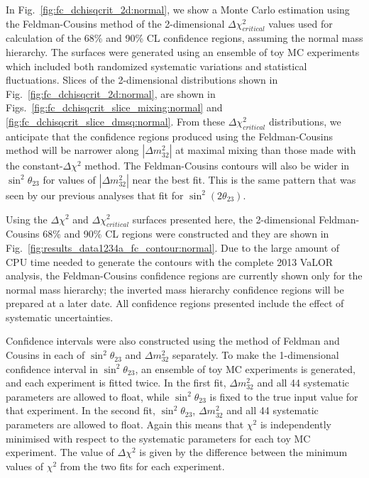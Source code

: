 In Fig.\ \ref{fig:fc_dchisqcrit_2d:normal}, we show a Monte Carlo estimation using the Feldman-Cousins method
of the 2-dimensional $\Delta\chi^{2}_{critical}$ values
used for calculation of the 68\% and 90\% CL confidence regions,
assuming the normal mass hierarchy.
The surfaces were generated using an ensemble of toy MC experiments which included both
randomized systematic variations and statistical fluctuations.
Slices of the 2-dimensional distributions shown in Fig.\ \ref{fig:fc_dchisqcrit_2d:normal},
are shown in Figs.\ \ref{fig:fc_dchisqcrit_slice_mixing:normal} and \ref{fig:fc_dchisqcrit_slice_dmsq:normal}.
From these $\Delta\chi^{2}_{critical}$ distributions, we anticipate that the confidence regions produced
using the Feldman-Cousins method will be narrower along $|\Delta{m^{2}_{32}}|$ at maximal mixing than
those made with the constant-$\Delta\chi^{2}$ method. The Feldman-Cousins contours will also be wider
in $\sin^{2}{\theta_{23}}$ for values of $|\Delta{m^{2}_{32}}|$ near the best fit.
This is the same pattern that was seen by our previous analyses 
\cite{OurRun12DisappAnalysis,OurRun123DisappAnalysis3Flavour} that fit for
$\sin^2(2\theta_{23})$.

Using the $\Delta\chi^2$ and $\Delta\chi^{2}_{critical}$ surfaces presented here,
the 2-dimensional Feldman-Cousins 68\% and 90\% CL regions were constructed 
and they are shown in Fig.\ \ref{fig:results_data1234a_fc_contour:normal}.
Due to the large amount of CPU time needed to generate the contours with the complete 2013 VaLOR analysis,
the Feldman-Cousins confidence regions are currently shown
only for the normal mass hierarchy;
the inverted mass hierarchy confidence regions will be prepared at a later date.
All confidence regions presented include the effect of systematic uncertainties.

Confidence intervals were also constructed using the method of Feldman and Cousins in each of $\sin^2 \theta_{23}$ and $
\Delta m_{32}^{2}$ separately. To make the 1-dimensional confidence interval in $\sin^2 \theta_{23}$, an ensemble of 
toy MC experiments is generated, and each experiment is fitted twice. In the first fit, $\Delta m_{32}^{2}$ and 
all 44 systematic parameters are allowed to float, while $\sin^2 \theta_{23}$ is fixed to the true input value 
for that experiment. In the second fit, $\sin^2 \theta_{23}$, $\Delta m_{32}^{2}$ and all 44 systematic parameters 
are allowed to float. Again this means that $\chi^{2}$ is independently minimised with respect to the systematic 
parameters for each toy MC experiment. The value of $\Delta\chi^{2}$ is given by the difference between the 
minimum values of $\chi^{2}$ from the two fits for each experiment. 

